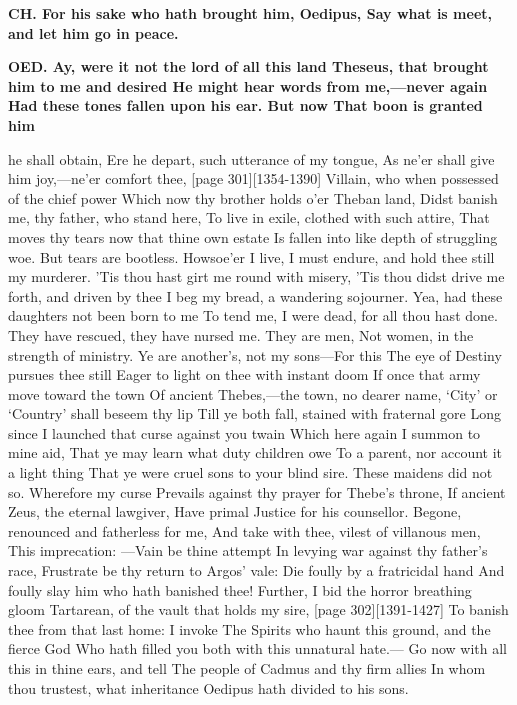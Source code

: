 \documentclass[11pt,letter]{book}
\begin{document}
\par \textbf{CH. For his sake who hath brought him, Oedipus, Say what is meet, and let him go in peace.}
\par 

\par \textbf{OED. Ay, were it not the lord of all this land Theseus, that brought him to me and desired He might hear words from me,—never again Had these tones fallen upon his ear. But now That boon is granted him}
\par   he shall obtain, Ere he depart, such utterance of my tongue, As ne’er shall give him joy,—ne’er comfort thee, [page 301][1354-1390] Villain, who when possessed of the chief power Which now thy brother holds o’er Theban land, Didst banish me, thy father, who stand here, To live in exile, clothed with such attire, That moves thy tears now that thine own estate Is fallen into like depth of struggling woe. But tears are bootless. Howsoe’er I live, I must endure, and hold thee still my murderer. ’Tis thou hast girt me round with misery, ’Tis thou didst drive me forth, and driven by thee I beg my bread, a wandering sojourner. Yea, had these daughters not been born to me To tend me, I were dead, for all thou hast done. They have rescued, they have nursed me. They are men, Not women, in the strength of ministry. Ye are another’s, not my sons—For this The eye of Destiny pursues thee still Eager to light on thee with instant doom If once that army move toward the town Of ancient Thebes,—the town, no dearer name, ‘City’ or ‘Country’ shall beseem thy lip Till ye both fall, stained with fraternal gore Long since I launched that curse against you twain Which here again I summon to mine aid, That ye may learn what duty children owe To a parent, nor account it a light thing That ye were cruel sons to your blind sire. These maidens did not so. Wherefore my curse Prevails against thy prayer for Thebe’s throne, If ancient Zeus, the eternal lawgiver, Have primal Justice for his counsellor. Begone, renounced and fatherless for me, And take with thee, vilest of villanous men, This imprecation: —Vain be thine attempt In levying war against thy father’s race, Frustrate be thy return to Argos’ vale:  Die foully by a fratricidal hand And foully slay him who hath banished thee! Further, I bid the horror breathing gloom Tartarean, of the vault that holds my sire, [page 302][1391-1427] To banish thee from that last home:  I invoke The Spirits who haunt this ground, and the fierce God Who hath filled you both with this unnatural hate.— Go now with all this in thine ears, and tell The people of Cadmus and thy firm allies In whom thou trustest, what inheritance Oedipus hath divided to his sons.
\end{document}
